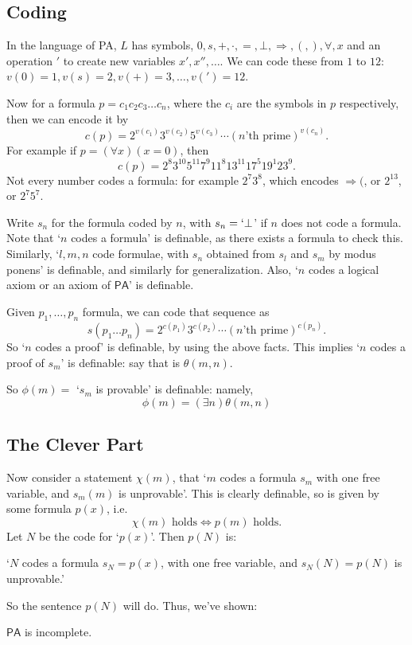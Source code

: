 \documentclass[12pt]{article}
\begin{document}
\subsection{Coding}
\label{sub:coding}

In the language of PA, $L$ has symbols, $0, s, +, \cdot, =, \bot, \Rightarrow, (, ), \forall, x$ and an operation $'$ to create new variables $x', x'', \ldots$. We can code these from $1$ to $12$: $v(0) = 1, v(s) = 2, v(+) = 3, \ldots, v(') = 12$.

Now for a formula $p = c_1c_2c_3\ldots c_n$, where the $c_i$ are the symbols in $p$ respectively, then we can encode it by
\[
	c(p) = 2^{v(c_1)}3^{v(c_2)}5^{v(c_3)}\cdots (n\text{'th prime})^{v(c_n)}.
\]
For example if $p = (\forall x)(x = 0)$, then
\[
c(p) = 2^{8}3^{10}5^{11}7^{9}11^{8}13^{11}17^{5}19^{1}23^{9}.
\]
Not every number codes a formula: for example $2^{7}3^{8}$, which encodes $\Rightarrow ($, or $2^{13}$, or $2^{7}5^{7}$.

Write $s_n$ for the formula coded by $n$, with $s_n = `\bot$' if $n$ does not code a formula. Note that `$n$ codes a formula' is definable, as there exists a formula to check this. Similarly, `$l, m, n$ code formulae, with $s_n$ obtained from $s_l$ and $s_m$ by modus ponens' is definable, and similarly for generalization. Also, `$n$ codes a logical axiom or an axiom of $\mathsf{PA}$' is definable.

Given $p_1, \ldots, p_n$ formula, we can code that sequence as
\[
	s(p_1\ldots p_n) = 2^{c(p_1)}3^{c(p_2)}\cdots (n\text{'th prime})^{c(p_n)}.
\]
So `$n$ codes a proof' is definable, by using the above facts. This implies `$n$ codes a proof of $s_m$' is definable: say that is $\theta(m, n)$.

So $\phi(m) =$ `$s_m$ is provable' is definable: namely,
\[
\phi(m) = (\exists n)\theta(m,n)
\]

\subsection{The Clever Part}
\label{sub:the_clever_part}

Now consider a statement $\chi(m)$, that `$m$ codes a formula $s_m$ with one free variable, and $s_m(m)$ is unprovable'. This is clearly definable, so is given by some formula $p(x)$, i.e. 
\[
	\chi(m) \text{ holds} \iff p(m) \text{ holds}.
\]
Let $N$ be the code for `$p(x)$'. Then $p(N)$ is:
\begin{center}
	`$N$ codes a formula $s_N = p(x)$, with one free variable, and $s_N(N) = p(N)$ is unprovable.'
\end{center} 
So the sentence $p(N)$ will do. Thus, we've shown:
\begin{theorem}
	$\mathsf{PA}$ is incomplete.
\end{theorem}
\end{document}
